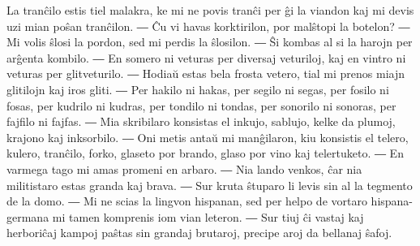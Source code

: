\begin{samepage}

La tranĉilo estis tiel malakra, ke mi ne povis tranĉi per ĝi la viandon kaj mi devis uzi mian poŝan tranĉilon. ― Ĉu vi havas korktirilon, por malŝtopi la botelon? ― Mi volis ŝlosi la pordon, sed mi perdis la ŝlosilon. ― Ŝi kombas al si la harojn per arĝenta kombilo. ― En somero ni veturas per diversaj veturiloj, kaj en vintro ni veturas per glitveturilo. ― Hodiaŭ estas bela frosta vetero, tial mi prenos miajn glitilojn kaj iros gliti. ― Per hakilo ni hakas, per segilo ni segas, per fosilo ni fosas, per kudrilo ni kudras, per tondilo ni tondas, per sonorilo ni sonoras, per fajfilo ni fajfas. ― Mia skribilaro konsistas el inkujo, sablujo, kelke da plumoj, krajono kaj inksorbilo. ― Oni metis antaŭ mi manĝilaron, kiu konsistis el telero, kulero, tranĉilo, forko, glaseto por brando, glaso por vino kaj telertuketo. ― En varmega tago mi amas promeni en arbaro. ― Nia lando venkos, ĉar nia militistaro estas granda kaj brava. ― Sur kruta ŝtuparo li levis sin al la tegmento de la domo. ― Mi ne scias la lingvon hispanan, sed per helpo de vortaro hispana-germana mi tamen komprenis iom vian leteron. ― Sur tiuj ĉi vastaj kaj herboriĉaj kampoj paŝtas sin grandaj brutaroj, precipe aroj da bellanaj ŝafoj.
\end{samepage}

